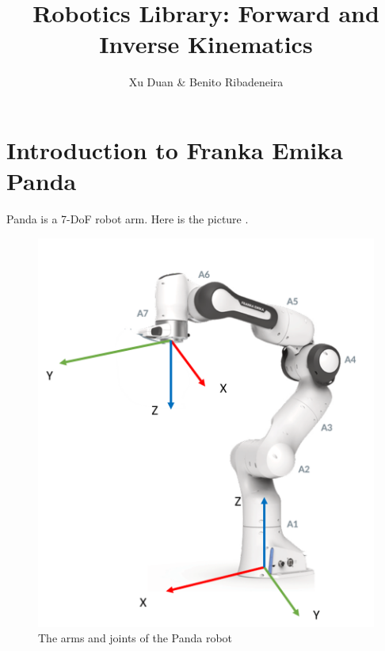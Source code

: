 \documentclass[english,10pt,a4paper]{article}
\author{Xu Duan \& Benito Ribadeneira}
\title{Robotics Library: Forward and Inverse Kinematics}
\begin{document}
    \maketitle
    \section{Introduction to Franka Emika Panda}
    Panda is a 7-DoF robot arm. Here is the picture \cite{franka_emika_2017}.
    \begin{figure}[H]\label{joints}
        \includegraphics[scale=0.7]{config2.png}
        \caption{The arms and joints of the Panda robot}
    \end{figure}
\end{document}
